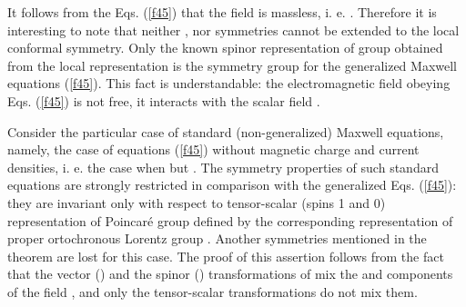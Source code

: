 \documentclass[a4paper,12pt]{article}
\begin{document}
It follows from the Eqs. (\ref{f45}) that the field \coordHE{} is massless, i. e. \coordHE{}. Therefore it is interesting to note
that neither \coordHE{}, nor \coordHE{} symmetries cannot be extended to the local
conformal \coordHE{} symmetry. Only the known spinor \coordHE{} representation of \coordHE{} group obtained from the local \coordHE{} representation is the symmetry
group for the generalized Maxwell equations (\ref{f45}). This fact is
understandable: the electromagnetic field \coordHE{} obeying Eqs. (\ref{f45}) is not
free, it interacts with the scalar field \coordHE{}.

Consider the particular case of standard (non-generalized) Maxwell
equations, namely, the case of equations (\ref{f45}) without magnetic charge
and current densities, i. e. the case when \coordHE{} but \coordHE{}. The
symmetry properties of such standard equations are strongly restricted in
comparison with the generalized Eqs. (\ref{f45}): they are invariant only
with respect to tensor-scalar (spins 1 and 0) representation of Poincar\'e
group defined by the corresponding representation \coordHE{} of
proper ortochronous Lorentz group \coordHE{}. Another symmetries mentioned in
the theorem are lost for this case. The proof of this assertion follows from
the fact that the vector (\coordHE{}) and the spinor
(\coordHE{})
transformations of \coordHE{}
mix the \coordHE{} and \coordHE{} components of the
field \coordHE{}, and only the tensor-scalar \coordHE{}
transformations do not mix them.
\end{document}

